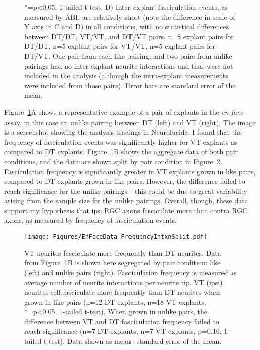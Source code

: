 \begin{figure}[hbtp]
\begin{center}
{        *=p<0.05, 1-tailed t-test.
        D) Inter-explant fasciculation events, as measured by ABI, are relatively short (note the difference in scale of Y axis in C and D) in all conditions, with no statistical differences between DT/DT, VT/VT, and DT/VT pairs.
        n=8 explant pairs for DT/DT, n=5 explant pairs for VT/VT, n=5 explant pairs for DT/VT.
        One pair from each like pairing, and two pairs from unlike pairings had no inter-explant neurite interactions and thus were not included in the analysis (although the intra-explant measurements were included from those pairs).
        Error bars are standard error of the mean.
        }
        \label{Figures/EnFaceData}
    \end{center}
\end{figure}

Figure~\ref{Figures/EnFaceData}A shows a representative example of a pair of explants in the \emph{en face} assay, in this case an unlike pairing between DT (left) and VT (right).
The image is a screenshot showing the analysis tracings in Neurolucida.
I found that the frequency of fasciculation events was significantly higher for VT explants as compared to DT explants.
Figure~\ref{Figures/EnFaceData}B shows the aggregate data of both pair conditions, and the data are shown split by pair condition in Figure~\ref{Figures/EnFaceDataFrequencyIntxnSplit}.
Fasciculation frequency is significantly greater in VT explants grown in like pairs, compared to DT explants grown in like pairs.
However, the difference failed to reach significance for the unlike pairings - this could be due to great variability arising from the sample size for the unlike pairings.
Overall, though, these data support my hypothesis that ipsi RGC axons fasciculate more than contra RGC axons, as measured by frequency of fasciculation events.
\begin{figure}[hbtp]
    \begin{center}
        \texttt{[image: Figures/EnFaceData\_FrequencyIntxnSplit.pdf]}
        \caption[VT neurites fasciculate more frequently than DT neurites.]
        {
        VT neurites fasciculate more frequently than DT neurites.
        Data from Figure~\ref{Figures/EnFaceData}B is shown here segregated by pair condition: like (left) and unlike pairs (right).
        Fasciculation frequency is measured as average number of neurite interactions per neurite tip.
		VT (ipsi) neurites self-fasciculate more frequently than DT neurites when grown in like pairs (n=12 DT explants, n=18 VT explants; *=p<0.05, 1-tailed t-test).
        When grown in unlike pairs, the difference between VT and DT fasciculation frequency failed to reach significance (n=7 DT explants, n=7 VT explants, p=0.16, 1-tailed t-test).
        Data shown as mean$\pm$standard error of the mean.
        }
        \label{Figures/EnFaceDataFrequencyIntxnSplit}
    \end{center}
\end{figure}

